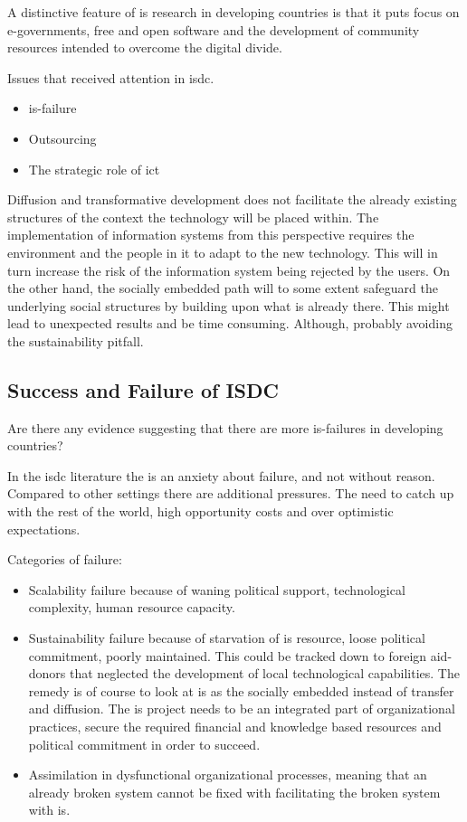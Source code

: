 A distinctive feature of \gls{is} research in developing countries is that it puts focus on e-governments, free and open software and the development of community resources intended to overcome the digital divide.

Issues that received attention in \gls{isdc}.
\begin{itemize}
\item \gls{is}-failure
\item Outsourcing
\item The strategic role of \gls{ict}
\end{itemize}

Diffusion and transformative development does not facilitate the already existing structures of the context the technology will be placed within.
The implementation of information systems from this perspective requires the environment and the people in it to adapt to the new technology.
This will in turn increase the risk of the information system being rejected by the users. On the other hand, the socially embedded path
will to some extent safeguard the underlying social structures by building upon what is already there. 
This might lead to unexpected results and be time consuming. Although, probably avoiding the sustainability pitfall.

\cite{ca:isdc}

\subsection{Success and Failure of ISDC}
\label{successandfailure}

Are there any evidence suggesting that there are more \gls{is}-failures in developing countries?




In the \gls{isdc} literature the is an anxiety about failure, and not without reason.
Compared to other settings there are additional pressures.
The need to catch up with the rest of the world, high opportunity costs and over optimistic expectations.




Categories of failure:
\begin{itemize}
\item Scalability failure because of waning political support, technological complexity, human resource capacity.
\item Sustainability failure because of starvation of \gls{is} resource, loose political commitment, poorly maintained. This could be tracked down to foreign aid-donors that neglected the development of local technological capabilities. The remedy is of course to look at \gls{is} as the socially embedded instead of transfer and diffusion. The \gls{is} project needs to be an integrated part of organizational practices, secure the required financial and knowledge based resources and political commitment in order to succeed.
\item Assimilation in dysfunctional organizational processes, meaning that an already broken system cannot be fixed with facilitating the broken system with \gls{is}.
\end{itemize}





